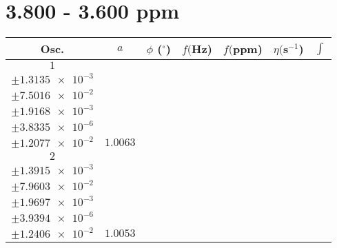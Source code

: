 \documentclass[8pt]{article}
\begin{document}
\section*{3.800 - 3.600 ppm}
\begin{longtable}[l]{c c c c c c c}
\toprule
Osc. & $a$ & $\phi$ ($^{\circ}$) & $f ($Hz) & $f ($ppm) & $\eta ($s$^{-1}$) & $\int$\\
\midrule
$\num{1}$ & \begin{tabular}[c]{@{}c@{}}$\num{1.0018}$ \\ $\pm\num{1.3135e-3}$\end{tabular} & \begin{tabular}[c]{@{}c@{}}$\num{9.1221e-2}$ \\ $\pm\num{7.5016e-2}$\end{tabular} & \begin{tabular}[c]{@{}c@{}}$\num{1.8356e+3}$ \\ $\pm\num{1.9168e-3}$\end{tabular} & \begin{tabular}[c]{@{}c@{}}$\num{3.6712}$ \\ $\pm\num{3.8335e-6}$\end{tabular} & \begin{tabular}[c]{@{}c@{}}$\num{7.0187}$ \\ $\pm\num{1.2077e-2}$\end{tabular} & $\num{1.0063}$\\
$\num{2}$ & \begin{tabular}[c]{@{}c@{}}$\num{1.0003}$ \\ $\pm\num{1.3915e-3}$\end{tabular} & \begin{tabular}[c]{@{}c@{}}$\num{0.14256}$ \\ $\pm\num{7.9603e-2}$\end{tabular} & \begin{tabular}[c]{@{}c@{}}$\num{1.8442e+3}$ \\ $\pm\num{1.9697e-3}$\end{tabular} & \begin{tabular}[c]{@{}c@{}}$\num{3.6884}$ \\ $\pm\num{3.9394e-6}$\end{tabular} & \begin{tabular}[c]{@{}c@{}}$\num{6.9968}$ \\ $\pm\num{1.2406e-2}$\end{tabular} & $\num{1.0053}$\\

\end{longtable}
\end{document}
